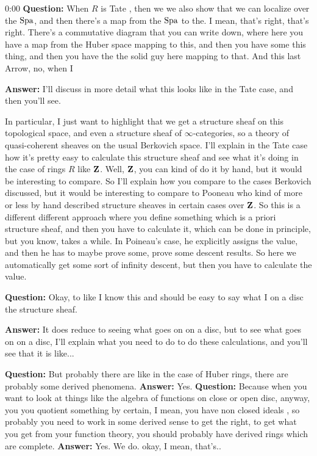 \begin{unfinished}{0:00}
\textbf{Question:} When $R$ is Tate , then we we also show that we can localize over the $\operatorname{Spa}$, and then there's a map from the $\operatorname{Spa}$ to the. I mean, that's right, that's right. 
There's a commutative diagram that you can write down, where here you have a map from the Huber space mapping to this, and then you have some this thing, and then you have the the solid guy here mapping to that. And this last Arrow, no, when I 

\textbf{Answer:} I'll discuss in more detail what this looks like in the Tate case, and then you'll see.

In particular, I just want to highlight that we get a structure sheaf on this topological space, and even a structure sheaf of $\infty$-categories, so a theory of quasi-coherent sheaves on the usual Berkovich space. 
I'll explain in the Tate case how it's pretty easy to calculate this structure sheaf and see what it's doing in the case of rings $R$ like $\mathbf Z$. Well, $\mathbf Z$, you can kind of do it by hand, but it would be interesting to compare. 
So I'll explain how you compare to the cases Berkovich discussed, but it would be interesting to compare to Pooneau \citeme{} who kind of more or less by hand described structure sheaves in certain cases over $\mathbf Z$. So this is a different different approach where you define something which is a priori structure sheaf, and then you have to calculate it, which can be done in principle, but you know, takes a while. In Poineau's case, he explicitly assigns the value, and then he has to maybe prove some, prove some descent results. So here we automatically get some sort of infinity descent, but then you have to calculate the value.

\textbf{Question:} Okay, to like I know this and should be easy to say what I on a disc the structure sheaf. 

\textbf{Answer:} It does reduce to seeing what goes on on a disc, but to see what goes on on a disc, I'll explain what you need to do to do these calculations, and you'll see that it is like...

\textbf{Question:} But probably there are like in the case of Huber rings, there are probably some derived phenomena.
\textbf{Answer:} Yes.
\textbf{Question:} Because when you want to look at things like the algebra of functions on close or open disc, anyway, you you quotient something by certain, I mean, you have non closed ideals , so probably you need to work in some derived sense to get the right, to get what you get from your function theory, you should probably have derived rings which are complete. 
\textbf{Answer:} Yes. We do. okay, I mean, that's..


\end{unfinished}
